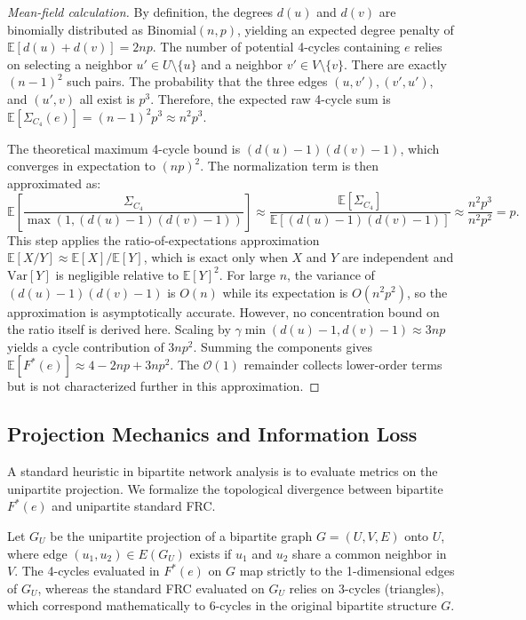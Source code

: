 \documentclass{siuro250211}
\theoremstyle{remark}
\theoremstyle{plain}
\begin{document}
\begin{proof}[Mean-field calculation]
By definition, the degrees $d(u)$ and $d(v)$ are binomially distributed as $\mathrm{Binomial}(n, p)$, yielding an expected degree penalty of $\mathbb{E}[d(u) + d(v)] = 2np$. The number of potential 4-cycles containing $e$ relies on selecting a neighbor $u' \in U \setminus \{u\}$ and a neighbor $v' \in V \setminus \{v\}$. There are exactly $(n-1)^2$ such pairs. The probability that the three edges $(u, v'), (v', u'),$ and $(u', v)$ all exist is $p^3$. Therefore, the expected raw 4-cycle sum is $\mathbb{E}[\Sigma_{C_4}(e)] = (n-1)^2 p^3 \approx n^2 p^3$.

The theoretical maximum 4-cycle bound is $(d(u)-1)(d(v)-1)$, which converges in expectation to $(np)^2$. The normalization term is then approximated as:
\begin{equation}
\mathbb{E}\left[ \frac{\Sigma_{C_4}}{\max(1, (d(u)-1)(d(v)-1))} \right] \approx \frac{\mathbb{E}[\Sigma_{C_4}]}{\mathbb{E}[(d(u)-1)(d(v)-1)]} \approx \frac{n^2 p^3}{n^2 p^2} = p.
\end{equation}
This step applies the ratio-of-expectations approximation $\mathbb{E}[X/Y] \approx \mathbb{E}[X]/\mathbb{E}[Y]$, which is exact only when $X$ and $Y$ are independent and $\mathrm{Var}[Y]$ is negligible relative to $\mathbb{E}[Y]^2$. For large $n$, the variance of $(d(u)-1)(d(v)-1)$ is $O(n)$ while its expectation is $O(n^2 p^2)$, so the approximation is asymptotically accurate. However, no concentration bound on the ratio itself is derived here. Scaling by $\gamma\min(d(u)-1,d(v)-1) \approx 3np$ yields a cycle contribution of $3np^2$. Summing the components gives $\mathbb{E}[F^*(e)] \approx 4 - 2np + 3np^2$. The $\mathcal{O}(1)$ remainder collects lower-order terms but is not characterized further in this approximation.
\end{proof}

\subsection{Projection Mechanics and Information Loss}
A standard heuristic in bipartite network analysis is to evaluate metrics on the unipartite projection. We formalize the topological divergence between bipartite $F^*(e)$ and unipartite standard FRC.

\begin{theorem}
Let $G_U$ be the unipartite projection of a bipartite graph $G=(U, V, E)$ onto $U$, where edge $(u_1, u_2) \in E(G_U)$ exists if $u_1$ and $u_2$ share a common neighbor in $V$. The 4-cycles evaluated in $F^*(e)$ on $G$ map strictly to the 1-dimensional edges of $G_U$, whereas the standard FRC evaluated on $G_U$ relies on 3-cycles (triangles), which correspond mathematically to 6-cycles in the original bipartite structure $G$.
\end{theorem}
\end{document}
